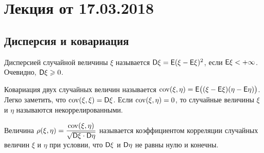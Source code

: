 \section{Лекция от 17.03.2018}
\subsection*{Дисперсия и ковариация}
\begin{definition}
	Дисперсией случайной величины $\xi$ называется $\mathsf{D} \xi = \mathsf{E} (\xi - \mathsf{E} \xi)^2 $, если $\mathsf{E}{\xi} < + \infty$. Очевидно, $\mathsf{D}{\xi} \geqslant 0$.
\end{definition}
\begin{definition}
	Ковариация двух случайных величин называется $\operatorname{cov} (\xi, \eta) = \mathsf{E} \big( ( \xi - \mathsf{E} \xi)(\eta - \mathsf{E} \eta ) \big)$. Легко заметить, что $\operatorname{cov} (\xi, \xi ) = \mathsf{D} \xi$. Если $\operatorname{cov} ( \xi, \eta) = 0$, то случайные величины $\xi$ и $\eta$ называются некоррелированными.
\end{definition}
\begin{definition}
	Величина $\rho ( \xi, \eta ) = \dfrac{\operatorname{cov} ( \xi, \eta )}{\sqrt{\mathsf{D} \xi \cdot \mathsf{D} \eta}}$ называется коэффициентом корреляции случайных величин $\xi$ и $\eta$ при условии, что $\mathsf{D} \xi$ и $\mathsf{D} \eta$ не равны нулю и конечны.
\end{definition}
